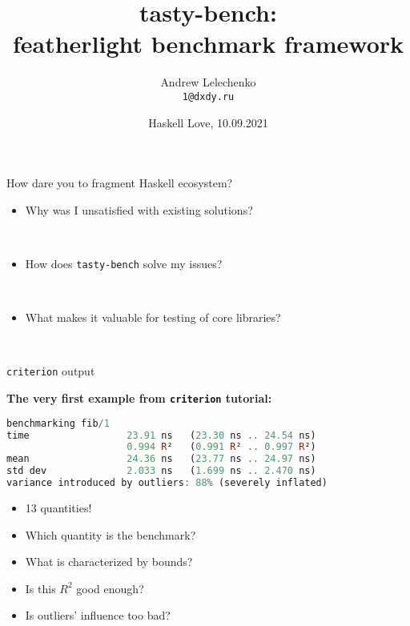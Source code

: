 \documentclass[handout]{beamer}
\title[tasty-bench: featherlight benchmark framework]{{\bf tasty-bench:} \\ featherlight benchmark framework}
\author[Andrew Lelechenko]{Andrew Lelechenko \\ \texttt{1@dxdy.ru}}
\date{Haskell Love, 10.09.2021}
\begin{document}
\begin{frame}
  \titlepage
\end{frame}

\begin{frame}{How dare you to fragment Haskell ecosystem?}

\pause

\begin{itemize}[<+->]
\item Why was I unsatisfied with existing solutions? \par ~
\item How does {\tt tasty-bench} solve my issues? \par ~
\item What makes it valuable for testing of core libraries? \par ~
\end{itemize}

\end{frame}

\begin{frame}[fragile]{{\tt criterion} output}

\centerline{\bf The very first example from {\tt criterion} tutorial:}

\begin{lstlisting}[language=Haskell]
benchmarking fib/1
time                 23.91 ns   (23.30 ns .. 24.54 ns)
                     0.994 R²   (0.991 R² .. 0.997 R²)
mean                 24.36 ns   (23.77 ns .. 24.97 ns)
std dev              2.033 ns   (1.699 ns .. 2.470 ns)
variance introduced by outliers: 88% (severely inflated)
\end{lstlisting}

\pause

\begin{itemize}[<+->]
\item 13 quantities!
\item Which quantity is the benchmark?
\item What is characterized by bounds?
\item Is this $R^2$ good enough?
\item Is outliers' influence too bad?
\end{itemize}

\end{frame}
\end{document}
